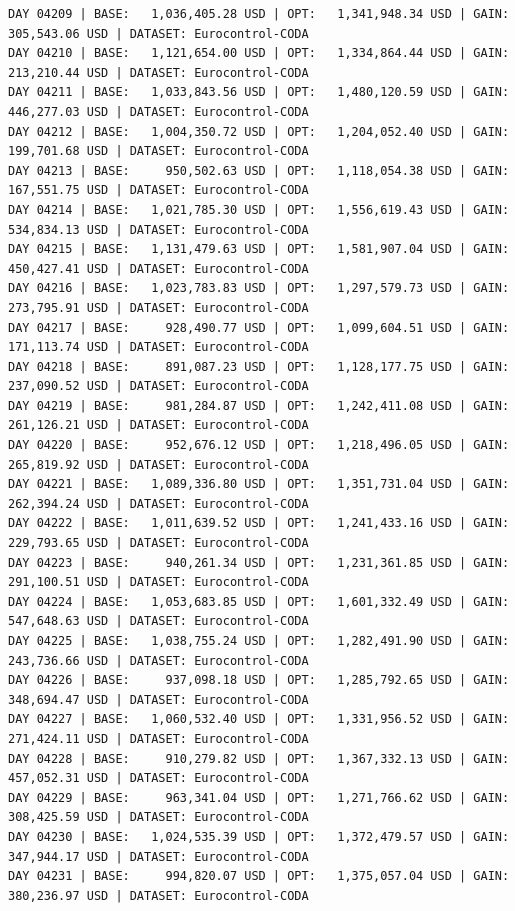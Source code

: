 \documentclass[11pt,a4paper]{article}
\begin{document}
\begin{verbatim}
DAY 04209 | BASE:   1,036,405.28 USD | OPT:   1,341,948.34 USD | GAIN: 305,543.06 USD | DATASET: Eurocontrol-CODA
DAY 04210 | BASE:   1,121,654.00 USD | OPT:   1,334,864.44 USD | GAIN: 213,210.44 USD | DATASET: Eurocontrol-CODA
DAY 04211 | BASE:   1,033,843.56 USD | OPT:   1,480,120.59 USD | GAIN: 446,277.03 USD | DATASET: Eurocontrol-CODA
DAY 04212 | BASE:   1,004,350.72 USD | OPT:   1,204,052.40 USD | GAIN: 199,701.68 USD | DATASET: Eurocontrol-CODA
DAY 04213 | BASE:     950,502.63 USD | OPT:   1,118,054.38 USD | GAIN: 167,551.75 USD | DATASET: Eurocontrol-CODA
DAY 04214 | BASE:   1,021,785.30 USD | OPT:   1,556,619.43 USD | GAIN: 534,834.13 USD | DATASET: Eurocontrol-CODA
DAY 04215 | BASE:   1,131,479.63 USD | OPT:   1,581,907.04 USD | GAIN: 450,427.41 USD | DATASET: Eurocontrol-CODA
DAY 04216 | BASE:   1,023,783.83 USD | OPT:   1,297,579.73 USD | GAIN: 273,795.91 USD | DATASET: Eurocontrol-CODA
DAY 04217 | BASE:     928,490.77 USD | OPT:   1,099,604.51 USD | GAIN: 171,113.74 USD | DATASET: Eurocontrol-CODA
DAY 04218 | BASE:     891,087.23 USD | OPT:   1,128,177.75 USD | GAIN: 237,090.52 USD | DATASET: Eurocontrol-CODA
DAY 04219 | BASE:     981,284.87 USD | OPT:   1,242,411.08 USD | GAIN: 261,126.21 USD | DATASET: Eurocontrol-CODA
DAY 04220 | BASE:     952,676.12 USD | OPT:   1,218,496.05 USD | GAIN: 265,819.92 USD | DATASET: Eurocontrol-CODA
DAY 04221 | BASE:   1,089,336.80 USD | OPT:   1,351,731.04 USD | GAIN: 262,394.24 USD | DATASET: Eurocontrol-CODA
DAY 04222 | BASE:   1,011,639.52 USD | OPT:   1,241,433.16 USD | GAIN: 229,793.65 USD | DATASET: Eurocontrol-CODA
DAY 04223 | BASE:     940,261.34 USD | OPT:   1,231,361.85 USD | GAIN: 291,100.51 USD | DATASET: Eurocontrol-CODA
DAY 04224 | BASE:   1,053,683.85 USD | OPT:   1,601,332.49 USD | GAIN: 547,648.63 USD | DATASET: Eurocontrol-CODA
DAY 04225 | BASE:   1,038,755.24 USD | OPT:   1,282,491.90 USD | GAIN: 243,736.66 USD | DATASET: Eurocontrol-CODA
DAY 04226 | BASE:     937,098.18 USD | OPT:   1,285,792.65 USD | GAIN: 348,694.47 USD | DATASET: Eurocontrol-CODA
DAY 04227 | BASE:   1,060,532.40 USD | OPT:   1,331,956.52 USD | GAIN: 271,424.11 USD | DATASET: Eurocontrol-CODA
DAY 04228 | BASE:     910,279.82 USD | OPT:   1,367,332.13 USD | GAIN: 457,052.31 USD | DATASET: Eurocontrol-CODA
DAY 04229 | BASE:     963,341.04 USD | OPT:   1,271,766.62 USD | GAIN: 308,425.59 USD | DATASET: Eurocontrol-CODA
DAY 04230 | BASE:   1,024,535.39 USD | OPT:   1,372,479.57 USD | GAIN: 347,944.17 USD | DATASET: Eurocontrol-CODA
DAY 04231 | BASE:     994,820.07 USD | OPT:   1,375,057.04 USD | GAIN: 380,236.97 USD | DATASET: Eurocontrol-CODA

\end{verbatim}
\end{document}
